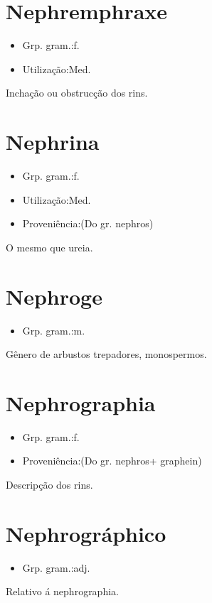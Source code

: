 \section{Nephremphraxe}
\begin{itemize}
\item {Grp. gram.:f.}
\end{itemize}
\begin{itemize}
\item {Utilização:Med.}
\end{itemize}
Inchação ou obstrucção dos rins.
\section{Nephrina}
\begin{itemize}
\item {Grp. gram.:f.}
\end{itemize}
\begin{itemize}
\item {Utilização:Med.}
\end{itemize}
\begin{itemize}
\item {Proveniência:(Do gr. \textunderscore nephros\textunderscore )}
\end{itemize}
O mesmo que \textunderscore ureia\textunderscore .
\section{Nephroge}
\begin{itemize}
\item {Grp. gram.:m.}
\end{itemize}
Gênero de arbustos trepadores, monospermos.
\section{Nephrographia}
\begin{itemize}
\item {Grp. gram.:f.}
\end{itemize}
\begin{itemize}
\item {Proveniência:(Do gr. \textunderscore nephros\textunderscore  + \textunderscore graphein\textunderscore )}
\end{itemize}
Descripção dos rins.
\section{Nephrográphico}
\begin{itemize}
\item {Grp. gram.:adj.}
\end{itemize}
Relativo á nephrographia.
